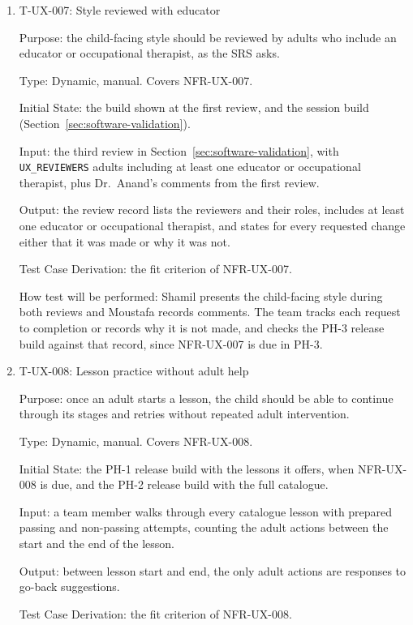 \documentclass[12pt, titlepage]{article}
\newcommand{\testitem}[1]{\item #1\par\nopagebreak}
\begin{document}
\begin{enumerate}
How test will be performed: after the review, the participants answer both
questions once for each child-facing screen, and the ratings for each screen are
kept in the review record.

\testitem{T-UX-007: Style reviewed with educator}

Purpose: the child-facing style should be reviewed by adults who include an
educator or occupational therapist, as the SRS asks.

Type: Dynamic, manual. Covers NFR-UX-007.

Initial State: the build shown at the first review, and the session build
(Section~\ref{sec:software-validation}).

Input: the third review in Section~\ref{sec:software-validation}, with
\texttt{UX\_REVIEWERS} adults including at least one educator or occupational
therapist, plus Dr.\ Anand's comments from the first review.

Output: the review record lists the reviewers and their roles, includes at least
one educator or occupational therapist, and states for every requested change
either that it was made or why it was not.

Test Case Derivation: the fit criterion of NFR-UX-007.

How test will be performed: Shamil presents the child-facing style during both
reviews and Moustafa records comments. The team tracks each request to completion
or records why it is not made, and checks the PH-3 release build against that
record, since NFR-UX-007 is due in PH-3.

\testitem{T-UX-008: Lesson practice without adult help}

Purpose: once an adult starts a lesson, the child should be able to continue
through its stages and retries without repeated adult intervention.

Type: Dynamic, manual. Covers NFR-UX-008.

Initial State: the PH-1 release build with the lessons it offers, when
NFR-UX-008 is due, and the PH-2 release build with the full catalogue.

Input: a team member walks through every catalogue lesson with prepared passing
and non-passing attempts, counting the adult actions between the start and the
end of the lesson.

Output: between lesson start and end, the only adult actions are responses to
go-back suggestions.

Test Case Derivation: the fit criterion of NFR-UX-008.


\end{enumerate}
\end{document}
